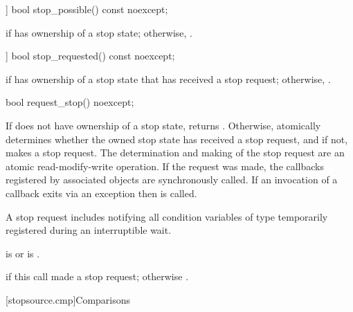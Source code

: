 %
\begin{itemdecl}
[[nodiscard]] bool stop_possible() const noexcept;
\end{itemdecl}

\begin{itemdescr}
\pnum
\returns
{} if  has ownership of a stop state;
otherwise, .
\end{itemdescr}

%
\begin{itemdecl}
[[nodiscard]] bool stop_requested() const noexcept;
\end{itemdecl}

\begin{itemdescr}
\pnum
\returns
{} if  has ownership of a stop state
that has received a stop request;
otherwise, .
\end{itemdescr}


%
\begin{itemdecl}
bool request_stop() noexcept;
\end{itemdecl}

\begin{itemdescr}
\pnum
\effects
If  does not have ownership of a stop state, returns .
Otherwise, atomically determines whether the owned stop state
has received a stop request,
and if not, makes a stop request.
The determination and making of the stop request are an
atomic read-modify-write operation.
If the request was made,
the callbacks registered by associated  objects
are synchronously called.
If an invocation of a callback exits via an exception
then  is called.
\begin{note}
A stop request includes notifying all condition variables
of type 
temporarily registered during
an interruptible wait.
\end{note}

\pnum
\ensures
{} is 
or  is .

\pnum
\returns
{} if this call made a stop request;
otherwise .
\end{itemdescr}

[stopsource.cmp]{Comparisons}

